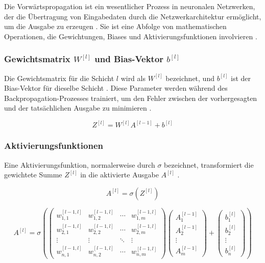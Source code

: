 Die Vorwärtspropagation ist ein wesentlicher Prozess in neuronalen Netzwerken, der die Übertragung von Eingabedaten durch die Netzwerkarchitektur ermöglicht, um die Ausgabe zu erzeugen \cite[p.~1421]{russell2021ai}. Sie ist eine Abfolge von mathematischen Operationen, die Gewichtungen, Biases und Aktivierungsfunktionen involvieren \cite[p.~73]{Chollet2021}.

\subsubsection{Gewichtsmatrix \( W^{[l]} \) und Bias-Vektor \( b^{[l]} \)}
Die Gewichtsmatrix für die Schicht \( l \) wird als \( W^{[l]} \) bezeichnet, und \( b^{[l]} \) ist der Bias-Vektor für dieselbe Schicht \cite[p.~46]{heaton_2012}. Diese Parameter werden während des Backpropagation-Prozesses trainiert, um den Fehler zwischen der vorhergesagten und der tatsächlichen Ausgabe zu minimieren \cite[p.~41]{aggarwal_neural_networks_2018}.

\begin{equation}
Z^{[l]} = W^{[l]} A^{[l-1]} + b^{[l]}
\end{equation}

\subsubsection{Aktivierungsfunktionen}
Eine Aktivierungsfunktion, normalerweise durch \( \sigma \) bezeichnet, transformiert die gewichtete Summe \( Z^{[l]} \) in die aktivierte Ausgabe \( A^{[l]} \) \cite[p.~1421]{russell2021ai}.

\begin{equation}
A^{[l]} = \sigma(Z^{[l]})
\end{equation}

\begin{equation}
A^{[l]} = \sigma \left( 
\begin{pmatrix}
w_{1,1}^{[l-1,l]} & w_{1,2}^{[l-1,l]} & \cdots & w_{1,m}^{[l-1,l]} \\
w_{2,1}^{[l-1,l]} & w_{2,2}^{[l-1,l]} & \cdots & w_{2,m}^{[l-1,l]} \\
\vdots & \vdots & \ddots & \vdots \\
w_{n,1}^{[l-1,l]} & w_{n,2}^{[l-1,l]} & \cdots & w_{n,m}^{[l-1,l]}
\end{pmatrix}
\begin{pmatrix}
A_1^{[l-1]} \\
A_2^{[l-1]} \\
\vdots \\
A_m^{[l-1]}
\end{pmatrix}
+
\begin{pmatrix}
b_1^{[l]} \\
b_2^{[l]} \\
\vdots \\
b_n^{[l]}
\end{pmatrix}
\right)
\end{equation}

